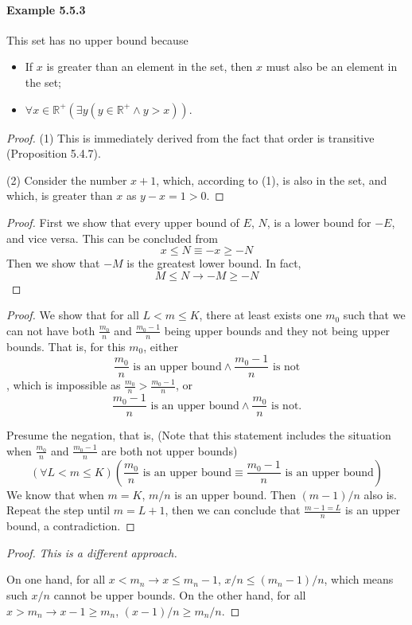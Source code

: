 \paragraph{Example 5.5.3}
This set has no upper bound because
\begin{itemize}
\item If $x$ is greater than an element in the set, then $x$ must also be an element in the set;
\item $\forall x \in \mathbb{R}^+(\exists y(y \in \mathbb{R}^+ \wedge y>x))$.
\end{itemize}
\begin{proof}
(1)
This is immediately derived from the fact that order is transitive (Proposition 5.4.7).

(2)
Consider the number $x+1$, which, according to (1), is also in the set, and which, is greater than $x$ as $y-x = 1>0$.
\end{proof}

\begin{proof}
First we show that every upper bound of $E$, $N$, is a lower bound for $-E$, and vice versa. This can be concluded from
\[
x \leq N \equiv -x \geq -N
\]
Then we show that $-M$ is the greatest lower bound. In fact,
\[
M \leq N \to -M \geq -N
\]
\end{proof}

\begin{proof}
We show that for all $L<m\leq K$, there at least exists one $m_0$ such that we can not have both $\frac{m_0}{n}$ and $\frac{m_0-1}{n}$ being upper bounds and they not being upper bounds. That is, for this $m_0$, either 
\[
\frac{m_0}{n} \text{ is an upper bound} \wedge \frac{m_0-1}{n} \text{ is not}
\]
, which is impossible as $\frac{m_0}{n}>\frac{m_0-1}{n}$, or
\[
\frac{m_0-1}{n} \text{ is an upper bound} \wedge \frac{m_0}{n} \text{ is not}.
\]

Presume the negation, that is, (Note that this statement includes the situation when $\frac{m_0}{n}$ and $\frac{m_0-1}{n}$ are both not upper bounds)
\[
(\forall L<m\leq K)(\frac{m_0}{n} \text{ is an upper bound} \equiv \frac{m_0-1}{n} \text{ is an upper bound})
\]
We know that when $m=K$, $m/n$ is an upper bound. Then $(m-1)/n$ also is. Repeat the step until $m=L+1$, then we can 
conclude that $\frac{m-1=L}{n}$ is an upper bound, a contradiction.
\end{proof}

\begin{proof}
\emph{This is a different approach.}

On one hand, for all $x<m_n \to x \leq m_n-1$, $x/n\leq (m_n-1)/n$, which means such $x/n$ cannot be upper bounds. On the other hand, 
for all $x>m_n \to x-1\geq m_n$, $(x-1)/n\geq m_n/n$.
\end{proof}

